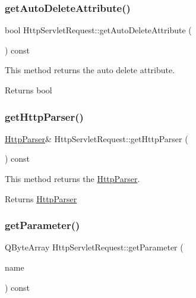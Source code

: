 \subsubsection{\texorpdfstring{get\+Auto\+Delete\+Attribute()}{getAutoDeleteAttribute()}}
{\footnotesize\ttfamily bool Http\+Servlet\+Request\+::get\+Auto\+Delete\+Attribute (\begin{DoxyParamCaption}{ }\end{DoxyParamCaption}) const\hspace{0.3cm}{\ttfamily [inline]}}



This method returns the auto delete attribute. 

\begin{DoxyReturn}{Returns}
bool 
\end{DoxyReturn}
\mbox{\label{class_http_servlet_request_a5829880fa0effb4b13fbad10e1b4481f}} 
\subsubsection{\texorpdfstring{get\+Http\+Parser()}{getHttpParser()}}
{\footnotesize\ttfamily \hyperlink{class_http_parser}{Http\+Parser}\& Http\+Servlet\+Request\+::get\+Http\+Parser (\begin{DoxyParamCaption}{ }\end{DoxyParamCaption}) const\hspace{0.3cm}{\ttfamily [inline]}}



This method returns the \hyperlink{class_http_parser}{Http\+Parser}. 

\begin{DoxyReturn}{Returns}
\hyperlink{class_http_parser}{Http\+Parser} 
\end{DoxyReturn}
\mbox{\label{class_http_servlet_request_a707c561d255615792ebe3bc9b8e3896c}} 
\subsubsection{\texorpdfstring{get\+Parameter()}{getParameter()}}
{\footnotesize\ttfamily Q\+Byte\+Array Http\+Servlet\+Request\+::get\+Parameter (\begin{DoxyParamCaption}\item[{const Q\+Byte\+Array \&}]{name }\end{DoxyParamCaption}) const\hspace{0.3cm}{\ttfamily [inline]}}



